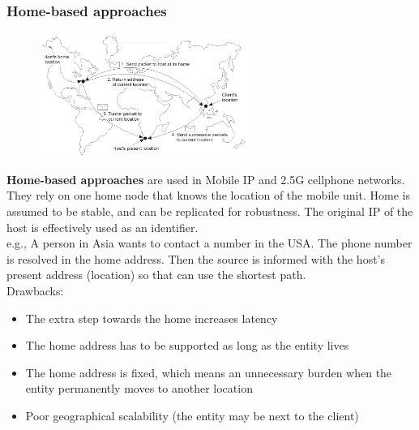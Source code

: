 \documentclass[10pt,a4paper]{article}
\begin{document}
\subsubsection{Home-based approaches}
\begin{figure}[h!]
 \hfill \includegraphics[width=200pt]{images/home-based.png}\hspace*{\fill}
  \label{fig:home-based}
\end{figure}
\textbf{Home-based approaches} are used in Mobile IP and 2.5G cellphone networks. They rely on one home node that knows the location of the mobile unit. Home is assumed to be stable, and can be replicated for robustness. The original IP of the host is effectively used as an identifier. \\
e.g., A person in Asia wants to contact a number in the USA. The phone number is resolved in the home address. Then the source is informed with the host's present address (location) so that can use the shortest path. \\
Drawbacks:
\begin{itemize}
	\item The extra step towards the home increases latency
	\item The home address has to be supported as long as the entity lives
	\item The home address is fixed, which means an unnecessary burden when the entity permanently moves to another location
	\item Poor geographical scalability (the entity may be next to the client)
\end{itemize}
\end{document}
